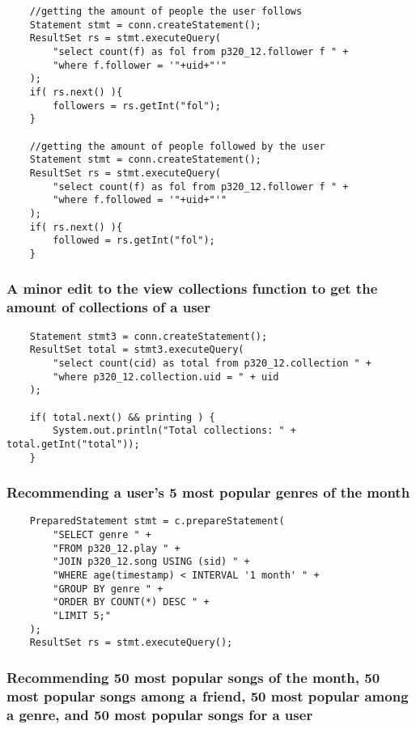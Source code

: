 \documentclass[12pt]{article}
\begin{document}
    \begin{lstlisting}
    //getting the amount of people the user follows
    Statement stmt = conn.createStatement();
    ResultSet rs = stmt.executeQuery(
        "select count(f) as fol from p320_12.follower f " +
        "where f.follower = '"+uid+"'"
    );
    if( rs.next() ){
        followers = rs.getInt("fol");
    }

    //getting the amount of people followed by the user
    Statement stmt = conn.createStatement();
    ResultSet rs = stmt.executeQuery(
        "select count(f) as fol from p320_12.follower f " +
        "where f.followed = '"+uid+"'"
    );
    if( rs.next() ){
        followed = rs.getInt("fol");
    }
    \end{lstlisting}

    \subsubsection{A minor edit to the view collections function to get the amount of collections of a user}

    \begin{lstlisting}
    Statement stmt3 = conn.createStatement();
    ResultSet total = stmt3.executeQuery(
        "select count(cid) as total from p320_12.collection " +
        "where p320_12.collection.uid = " + uid
    );

    if( total.next() && printing ) {
        System.out.println("Total collections: " + total.getInt("total"));
    }
    \end{lstlisting}

   \subsubsection{Recommending a user's 5 most popular genres of the month}

    \begin{lstlisting}
    PreparedStatement stmt = c.prepareStatement(
        "SELECT genre " +
        "FROM p320_12.play " +
        "JOIN p320_12.song USING (sid) " +
        "WHERE age(timestamp) < INTERVAL '1 month' " +
        "GROUP BY genre " +
        "ORDER BY COUNT(*) DESC " +
        "LIMIT 5;"
    );
    ResultSet rs = stmt.executeQuery();
    \end{lstlisting}


    \subsubsection{Recommending 50 most popular songs of the month, 50 most popular songs among a friend, 50 most popular among a genre, and 50 most popular songs for a user}
\end{document}
